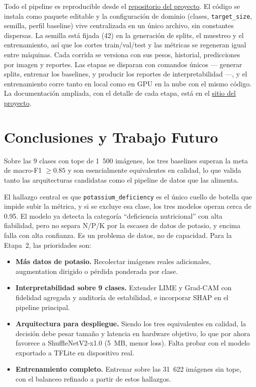 \documentclass[12pt,letterpaper]{article}
\begin{document}
Todo el pipeline es reproducible desde el \href{https://github.com/daiv05/maize-doctor-classifier}{repositorio del proyecto}. El c\'odigo se instala como paquete editable y la configuraci\'on de dominio (clases, \texttt{target\_size}, semilla, perfil baseline) vive centralizada en un \'unico archivo, sin constantes dispersas. La semilla est\'a fijada (42) en la generaci\'on de splits, el muestreo y el entrenamiento, as\'i que los cortes train/val/test y las m\'etricas se regeneran igual entre m\'aquinas. Cada corrida se versiona con sus pesos, historial, predicciones por imagen y reportes. Las etapas se disparan con comandos \'unicos --- generar splits, entrenar los baselines, y producir los reportes de interpretabilidad ---, y el entrenamiento corre tanto en local como en GPU en la nube con el mismo c\'odigo. La documentaci\'on ampliada, con el detalle de cada etapa, est\'a en el \href{https://doctor-maiz.deras.dev/es}{sitio del proyecto}.

\section{Conclusiones y Trabajo Futuro}

Sobre las 9 clases con tope de 1~500 im\'agenes, los tres baselines superan la meta de macro-F1 $\geq0.85$ y son esencialmente equivalentes en calidad, lo que valida tanto las arquitecturas candidatas como el pipeline de datos que las alimenta.

El hallazgo central es que \texttt{potassium\_deficiency} es el \'unico cuello de botella que impide subir la m\'etrica, y si se excluye esa clase, los tres modelos operan cerca de 0.95. El modelo ya detecta la categor\'ia ``deficiencia nutricional'' con alta fiabilidad, pero no separa N/P/K por la escasez de datos de potasio, y encima falla con alta confianza. Es un problema de datos, no de capacidad. Para la Etapa~2, las prioridades son:

\begin{itemize}
\item \textbf{M\'as datos de potasio.} Recolectar im\'agenes reales adicionales, augmentation dirigido o p\'erdida ponderada por clase.
\item \textbf{Interpretabilidad sobre 9 clases.} Extender LIME y Grad-CAM con fidelidad agregada y auditor\'ia de estabilidad, e incorporar SHAP en el pipeline principal.
\item \textbf{Arquitectura para despliegue.} Siendo los tres equivalentes en calidad, la decisi\'on debe pesar tama\~no y latencia en hardware objetivo, lo que por ahora favorece a ShuffleNetV2-x1.0 (5~MB, menor loss). Falta probar con el modelo exportado a TFLite en dispositivo real.
\item \textbf{Entrenamiento completo.} Entrenar sobre las 31~622 im\'agenes sin tope, con el balanceo refinado a partir de estos hallazgos.
\end{itemize}
\end{document}

